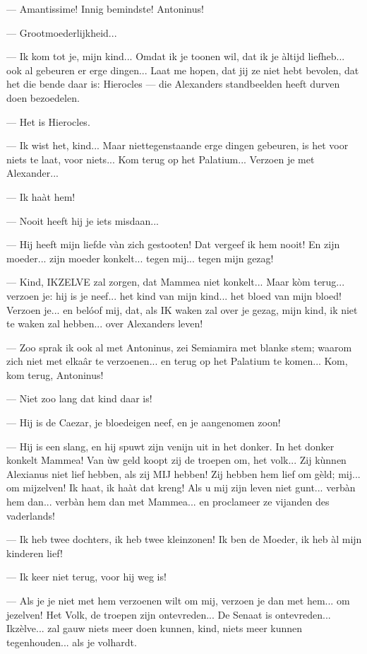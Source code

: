 \documentclass[a4paper, 12pt, oneside, dutch]{article}
\begin{document}
--- Amantissime! Innig bemindste! Antoninus!

--- Grootmoederlijkheid...

--- Ik kom tot je, mijn kind... Omdat ik je toonen wil, dat ik je àltijd liefheb... ook al gebeuren er erge dingen... Laat me hopen, dat jij ze niet hebt bevolen, dat het die bende daar is: Hierocles --- die Alexanders standbeelden heeft durven doen bezoedelen.

--- Het is Hierocles.

--- Ik wist het, kind... Maar niettegenstaande erge dingen gebeuren, is het voor niets te laat, voor niets... Kom terug op het Palatium... Verzoen je met Alexander...

--- Ik haàt hem!

--- Nooit heeft hij je iets misdaan...

--- Hij heeft mijn liefde vàn zich gestooten! Dat vergeef ik hem nooit! En zijn moeder... zijn moeder konkelt... tegen mij... tegen mijn gezag!

--- Kind, IKZELVE zal zorgen, dat Mammea niet konkelt... Maar kòm terug... verzoen je: hij is je neef... het kind van mijn kind... het bloed van mijn bloed! Verzoen je... en belóof mij, dat, als IK waken zal over je gezag, mijn kind, ik niet te waken zal hebben... over Alexanders leven!

--- Zoo sprak ik ook al met Antoninus, zei Semiamira met blanke stem; waarom zich niet met elkaâr te verzoenen... en terug op het Palatium te komen... Kom, kom terug, Antoninus!

--- Niet zoo lang dat kind daar is!

--- Hij is de Caezar, je bloedeigen neef, en je aangenomen zoon!

--- Hij is een slang, en hij spuwt zijn venijn uit in het donker. In het donker konkelt Mammea! Van ùw geld koopt zij de troepen om, het volk... Zij kùnnen Alexianus niet lief hebben, als zij MIJ hebben! Zij hebben hem lief om gèld; mij... om mijzelven! Ik haat, ik haàt dat kreng! Als u mij zijn leven niet gunt... verbàn hem dan... verbàn hem dan met Mammea... en proclameer ze vijanden des vaderlands!

--- Ik heb twee dochters, ik heb twee kleinzonen! Ik ben de Moeder, ik heb àl mijn kinderen lief!

--- Ik keer niet terug, voor hij weg is!

--- Als je je niet met hem verzoenen wilt om mij, verzoen je dan met hem... om jezelven! Het Volk, de troepen zijn ontevreden... De Senaat is ontevreden... Ikzèlve... zal gauw niets meer doen kunnen, kind, niets meer kunnen tegenhouden... als je volhardt.
\end{document}
